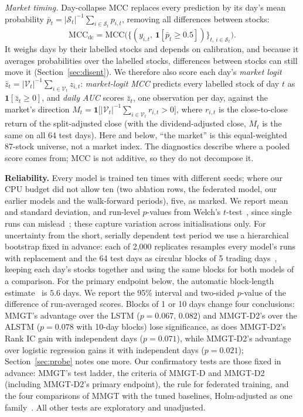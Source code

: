 \documentclass[conference]{IEEEtran}
\begin{document}
\emph{Market timing.} Day-collapse MCC replaces every prediction by its day's mean
probability $\bar p_t=|\mathcal{S}_t|^{-1}\sum_{i\in\mathcal{S}_t}p_{i,t}$, removing
all differences between stocks:
\begin{equation}
\mathrm{MCC}_{\mathrm{dc}}=\mathrm{MCC}\bigl(\{(y_{i,t},\,\mathbf{1}[\bar p_t\ge 0.5])\}_{t,\,i\in\mathcal{S}_t}\bigr).
\end{equation}
It weighs days by their labelled stocks and depends on calibration, and because it
averages probabilities over the labelled stocks, differences between stocks can still
move it (Section~\ref{sec:disent}). We therefore also score each day's \emph{market
logit} $\bar z_t=|\mathcal{V}_t|^{-1}\sum_{i\in\mathcal{V}_t}z_{i,t}$:
\emph{market-logit MCC} predicts every labelled stock of day $t$ as
$\mathbf{1}[\bar z_t\ge 0]$, and \emph{daily AUC} scores $\bar z_t$, one observation
per day, against the market's direction
$M_t=\mathbf{1}\bigl[|\mathcal{V}_t|^{-1}\sum_{i\in\mathcal{V}_t}r_{i,t}>0\bigr]$,
where $r_{i,t}$ is the close-to-close return of the split-adjusted close (with the
dividend-adjusted close, $M_t$ is the same on all 64 test days). Here and below, ``the
market'' is this equal-weighted 87-stock universe, not a market index. The diagnostics
describe where a pooled score comes from; MCC is not additive, so they do not
decompose it.

\textbf{Reliability.} Every model is trained ten times with different seeds; where
our CPU budget did not allow ten (two ablation rows, the federated model, our earlier
models and the walk-forward periods), five, as marked. We report mean and standard
deviation, and run-level $p$-values from Welch's $t$-test~\cite{welch1947}, since
single runs can mislead~\cite{henderson2018}; these capture variation across
initialisations only.
For uncertainty from the short, serially dependent test period we use a hierarchical
bootstrap fixed in advance: each of 2{,}000 replicates resamples every model's runs
with replacement and the 64 test days as circular blocks of 5 trading
days~\cite{kunsch1989}, keeping each day's stocks together and using the same blocks
for both models of a comparison. For the primary endpoint below, the automatic
block-length estimate~\cite{politis2004,patton2009} is $5.6$ days. We report the
95\% interval and two-sided $p$-value of the difference of run-averaged scores.
Blocks of 1 or 10 days change four conclusions: MMGT's advantage over the LSTM
($p=0.067$, $0.082$) and MMGT-D2's over the ALSTM ($p=0.078$ with 10-day blocks)
lose significance, as does MMGT-D2's Rank IC gain with independent days ($p=0.071$),
while MMGT-D2's advantage over logistic regression gains it with independent days
($p=0.021$); Section~\ref{sec:probe} notes one more. Our confirmatory tests are those
fixed in advance: MMGT's test ladder, the criteria of MMGT-D and MMGT-D2 (including
MMGT-D2's primary endpoint), the rule for federated training, and the four
comparisons of MMGT with the tuned baselines, Holm-adjusted as one
family~\cite{holm1979}. All other tests are exploratory and unadjusted.
\end{document}
